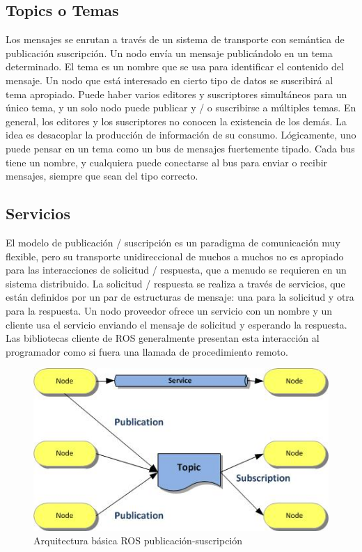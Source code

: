 \subsection{Topics o Temas}


Los mensajes se enrutan a través de un sistema de transporte con semántica de publicación suscripción. Un nodo envía un mensaje publicándolo en un tema determinado. El tema es un nombre que se usa para identificar el contenido del mensaje. Un nodo que está interesado en cierto tipo de datos se suscribirá al tema apropiado. Puede haber varios editores y suscriptores simultáneos para un único tema, y un solo nodo puede publicar y / o suscribirse a múltiples temas. En general, los editores y los suscriptores no conocen la existencia de los demás. La idea es desacoplar la producción de información de su consumo. Lógicamente, uno puede pensar en un tema como un bus de mensajes fuertemente tipado. Cada bus tiene un nombre, y cualquiera puede conectarse al bus para enviar o recibir mensajes, siempre que sean del tipo correcto.

\subsection{Servicios}
El modelo de publicación / suscripción es un paradigma de comunicación muy flexible, pero su transporte unidireccional de muchos a muchos no es apropiado para las interacciones de solicitud / respuesta, que a menudo se requieren en un sistema distribuido. La solicitud / respuesta se realiza a través de servicios, que están definidos por un par de estructuras de mensaje: una para la solicitud y otra para la respuesta. Un nodo proveedor ofrece un servicio con un nombre y un cliente usa el servicio enviando el mensaje de solicitud y esperando la respuesta. Las bibliotecas cliente de ROS generalmente presentan esta interacción al programador como si fuera una llamada de procedimiento remoto.

\begin{figure}[H]
    \centering
    \includegraphics[scale=1]{img/ros-architecture-3.jpg}
  	\caption{Arquitectura básica ROS publicación-suscripción}
  	\label{fig:ros-servicio}
\end{figure}
